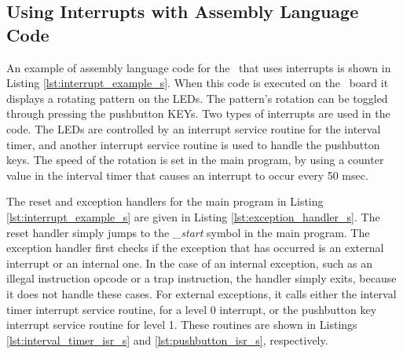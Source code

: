 \subsection{Using Interrupts with Assembly Language Code}

An example of assembly language code for the \systemName~that uses interrupts is
shown in Listing \ref{lst:interrupt_example_s}. When this code is executed on the \DEBoard~board
it displays a rotating pattern on the LEDs. The pattern's rotation can be toggled through pressing the pushbutton KEYs. Two types
of interrupts are used in the code. The LEDs are controlled by an interrupt
service routine for the interval timer, and another interrupt service routine is used to
handle the pushbutton keys. The speed of the rotation is set in the main
program, by using a counter value in the interval timer that causes an interrupt to occur
every 50 msec.

The reset and exception handlers for the main program in Listing \ref{lst:interrupt_example_s} 
are given in Listing \ref{lst:exception_handler_s}. The reset handler simply jumps to the
{\it \_start} symbol in the main program. The exception handler first checks if the
exception that has occurred is an external interrupt or an internal one. In the case of an
internal exception, such as an illegal instruction opcode or a trap instruction, the
handler simply exits, because it does not handle these cases. For external exceptions, it 
calls either the interval timer interrupt service routine, for a level 0 interrupt, or the
pushbutton key interrupt service routine for level 1. These routines are shown in Listings
\ref{lst:interval_timer_isr_s} and \ref{lst:pushbutton_isr_s}, respectively.


